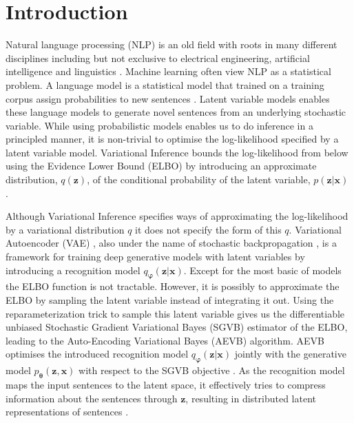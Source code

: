 \chapter{Introduction}
\label{IntroductionCh}



Natural language processing (NLP) is an old field with roots in many different
disciplines including but not exclusive to electrical engineering, artificial
intelligence and linguistics \cite[p.~10-15]{Jurafsky:2000:SLP:555733}. Machine
learning often view NLP as a statistical problem. A
language model is a statistical model that trained on a training corpus assign
probabilities to new sentences \cite{Bengio:2003:NPL:944919.944966}. Latent variable models enables these
language models to generate novel sentences from an underlying stochastic
variable. While using probabilistic models enables us to do inference in a
principled manner, it is non-trivial to optimise the log-likelihood
specified by a latent variable model. Variational Inference bounds the log-likelihood
from below using the Evidence Lower Bound (ELBO) by
introducing an approximate distribution, $q(\bm{z})$, of the conditional probability of the
latent variable, $p(\bm{z} | \bm{x})$ \cite{blei_variational_2017}.


Although Variational Inference specifies ways of approximating the
log-likelihood by a variational distribution $q$ it does not specify the form of
this $q$. Variational Autoencoder (VAE) \cite{kingma_auto-encoding_2013}, also
under the name of stochastic backpropagation \cite{2014arXiv1401.4082J}, is a
framework for training deep generative models with latent variables by
introducing a recognition model $q_{\bm{\varphi}}(\bm{z} | \bm{x})$. Except for the most basic of
models the ELBO function is not tractable. However, it is possibly to
approximate the ELBO by sampling the latent variable instead of
integrating it out. Using the reparameterization trick to sample this latent
variable gives us the differentiable unbiased Stochastic Gradient Variational
Bayes (SGVB) estimator of the ELBO, leading to the Auto-Encoding Variational
Bayes (AEVB) algorithm. AEVB optimises the introduced recognition model
$q_{\bm{\varphi}}(\bm{z} | \bm{x})$ jointly with the generative model
$p_{\bm{\theta}}(\bm{z}, \bm{x})$ with respect to the SGVB objective
\cite{kingma_auto-encoding_2013}. As the recognition model maps the input sentences to the latent space, it effectively tries to compress
information about the sentences through $\bm{z}$, resulting in distributed
latent representations of sentences \cite{bowman_generating_2015}.





